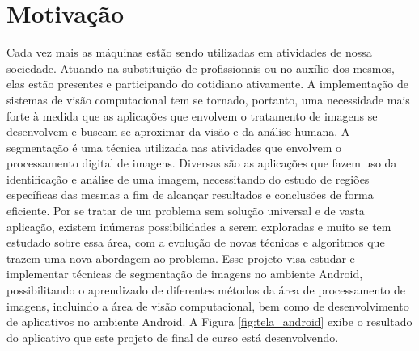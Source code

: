 \section{Motivação}
Cada vez mais as máquinas estão sendo utilizadas em atividades de nossa sociedade. Atuando na substituição de profissionais ou no auxílio dos mesmos, elas estão presentes e participando do cotidiano ativamente. A implementação de sistemas de visão computacional tem se tornado, portanto, uma necessidade mais forte à medida que as aplicações que envolvem o tratamento de imagens se desenvolvem e buscam se aproximar da visão e da análise humana.
A segmentação é uma técnica utilizada nas atividades que envolvem o processamento digital de imagens. Diversas são as aplicações que fazem uso da identificação e análise de uma imagem, necessitando do estudo de regiões específicas das mesmas a fim de alcançar resultados e conclusões de forma eficiente.
Por se tratar de um problema sem solução universal e de vasta aplicação,  existem inúmeras possibilidades a serem exploradas e muito se tem estudado sobre essa área, com a evolução de novas técnicas e algoritmos que trazem uma nova abordagem ao problema.
Esse projeto visa estudar e implementar técnicas de segmentação de imagens no ambiente Android, possibilitando o aprendizado de diferentes métodos da área de processamento de imagens, incluindo a área de visão computacional, bem como de desenvolvimento de aplicativos no ambiente Android. A Figura \ref{fig:tela_android} exibe o resultado do aplicativo que este projeto de final de curso está desenvolvendo.



